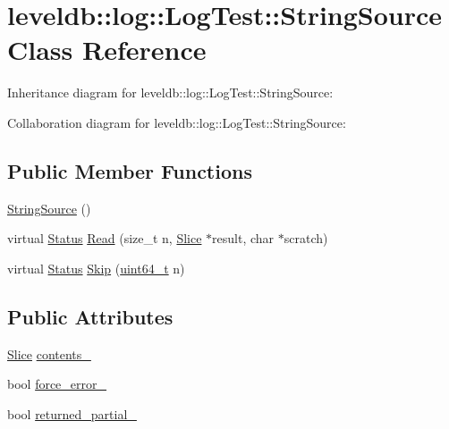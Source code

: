 \hypertarget{classleveldb_1_1log_1_1_log_test_1_1_string_source}{\section{leveldb\-:\-:log\-:\-:Log\-Test\-:\-:String\-Source Class Reference}
\label{classleveldb_1_1log_1_1_log_test_1_1_string_source}
}


Inheritance diagram for leveldb\-:\-:log\-:\-:Log\-Test\-:\-:String\-Source\-:


Collaboration diagram for leveldb\-:\-:log\-:\-:Log\-Test\-:\-:String\-Source\-:
\subsection*{Public Member Functions}
\begin{DoxyCompactItemize}
\item 
\hyperlink{classleveldb_1_1log_1_1_log_test_1_1_string_source_a85e7f1f81a71976d6f8d092930e9c671}{String\-Source} ()
\item 
virtual \hyperlink{classleveldb_1_1_status}{Status} \hyperlink{classleveldb_1_1log_1_1_log_test_1_1_string_source_a9a0ece28d3cc701007e4c816730deb6e}{Read} (size\-\_\-t n, \hyperlink{classleveldb_1_1_slice}{Slice} $\ast$result, char $\ast$scratch)
\item 
virtual \hyperlink{classleveldb_1_1_status}{Status} \hyperlink{classleveldb_1_1log_1_1_log_test_1_1_string_source_a33266e2d1e98780bd6a2720857a88100}{Skip} (\hyperlink{stdint_8h_aaa5d1cd013383c889537491c3cfd9aad}{uint64\-\_\-t} n)
\end{DoxyCompactItemize}
\subsection*{Public Attributes}
\begin{DoxyCompactItemize}
\item 
\hyperlink{classleveldb_1_1_slice}{Slice} \hyperlink{classleveldb_1_1log_1_1_log_test_1_1_string_source_aedd5386ec3e8dcbb9027d2b80702fc78}{contents\-\_\-}
\item 
bool \hyperlink{classleveldb_1_1log_1_1_log_test_1_1_string_source_aac39696e05d613c6123bbae4455c7c27}{force\-\_\-error\-\_\-}
\item 
bool \hyperlink{classleveldb_1_1log_1_1_log_test_1_1_string_source_aded237672ac96477565daa85e7c16d71}{returned\-\_\-partial\-\_\-}
\end{DoxyCompactItemize}


